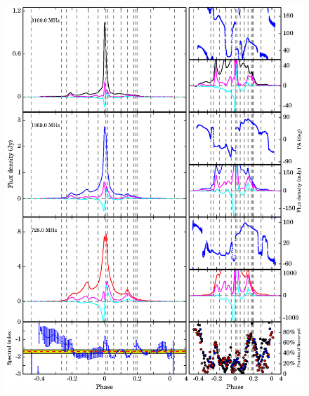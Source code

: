 \documentclass[useAMS,usenatbib]{mn2e}
\begin{document}
\begin{figure}
\begin{center}
\includegraphics[width=7 in]{0437.ps}
\end{center}
\end{figure}
\end{document}
